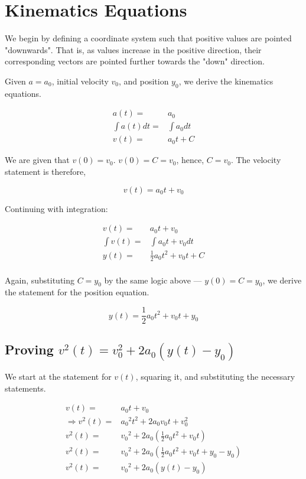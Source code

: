 \documentclass[letterpaper]{article}
\begin{document}
\section{Kinematics Equations}
\label{sec:org1e44f1a}
We begin by defining a coordinate system such that positive values are pointed "downwards". That is, as values increase in the positive direction, their corresponding vectors are pointed further towards the "down" direction.

Given \(a=a_0\), initial velocity \(v_0\), and position \(y_0\), we derive the kinematics equations.

\begin{align}
    a(t) =& a_0 \\
    \int a(t) dt =& \int a_0 dt \\
    v(t) =& a_0t + C 
\end{align}

We are given that \(v(0)=v_0\). \(v(0) = C = v_0\), hence, \(C=v_0\). The velocity statement is therefore,

\begin{equation}
    v(t) = a_0t+v_0
\end{equation}

Continuing with integration:

\begin{align}
    v(t) =& a_0t + v_0 \\
    \int v(t) =& \int a_0t + v_0 dt \\
    y(t) =& \frac{1}{2}a_0t^2+v_0t+C \\
\end{align}

Again, substituting \(C = y_0\) by the same logic above --- \(y(0) = C = y_0\), we derive the statement for the position equation.

\begin{equation}
    y(t) = \frac{1}{2}a_0t^2 + v_0t + y_0
\end{equation}


\subsection{Proving \(v^2(t) = v_0^2 + 2a_0(y(t)-y_0)\)}
\label{sec:orgc95471b}
We start at the statement for \(v(t)\), squaring it, and substituting the necessary statements.

\begin{align}
    v(t) =& a_0t+v_0 \\
    \Rightarrow v^2(t) =& {a_0}^2 t^2 + 2a_0v_0t + v_0^2 \\
    v^2(t) =& {v_0}^2 + 2a_0 (\frac{1}{2} a_0 t^2 + v_0t) \\
    v^2(t) =& {v_0}^2 + 2a_0 (\frac{1}{2} a_0 t^2 + v_0t + y_0 - y_0) \\
    v^2(t) =& {v_0}^2 + 2a_0 (y(t) - y_0) 
\end{align}
\end{document}
